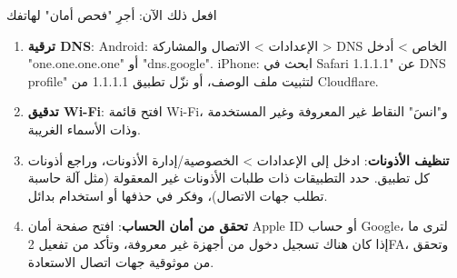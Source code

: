 \begin{tcbpractice}{افعل ذلك الآن: أجرِ "فحص أمان" لهاتفك}
\begin{enumerate}
  \item \textbf{ترقية DNS}: Android: الإعدادات > الاتصال والمشاركة > DNS الخاص > أدخل "one.one.one.one" أو "dns.google". iPhone: ابحث في Safari عن "1.1.1.1 DNS profile" لتثبيت ملف الوصف، أو نزّل تطبيق 1.1.1.1 من Cloudflare.
  \item \textbf{تدقيق Wi-Fi}: افتح قائمة Wi-Fi، و"انسَ" النقاط غير المعروفة وغير المستخدمة وذات الأسماء الغريبة.
  \item \textbf{تنظيف الأذونات}: ادخل إلى الإعدادات > الخصوصية/إدارة الأذونات، وراجع أذونات كل تطبيق. حدد التطبيقات ذات طلبات الأذونات غير المعقولة (مثل آلة حاسبة تطلب جهات الاتصال)، وفكر في حذفها أو استخدام بدائل.
  \item \textbf{تحقق من أمان الحساب}: افتح صفحة أمان Apple ID أو حساب Google، لترى ما إذا كان هناك تسجيل دخول من أجهزة غير معروفة، وتأكد من تفعيل 2FA، وتحقق من موثوقية جهات اتصال الاستعادة.
\end{enumerate}

\end{tcbpractice}

